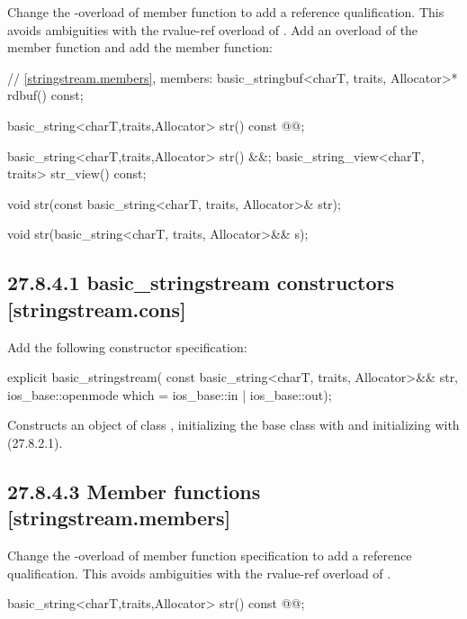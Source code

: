 \documentclass[ebook,11pt,article]{memoir}
\begin{document}
Change the -overload of  member function to add a reference qualification. This avoids ambiguities with the rvalue-ref overload of . Add an overload of the  member function and add the  member function:

\begin{codeblock}
    // \ref{stringstream.members}, members:
    basic_stringbuf<charT, traits, Allocator>* rdbuf() const;

    basic_string<charT,traits,Allocator> str() const @\ins{\&}@;
\end{codeblock}
\begin{addedblock}
\begin{codeblock}
    basic_string<charT,traits,Allocator> str() &&;
    basic_string_view<charT, traits> str_view() const;
\end{codeblock}
\end{addedblock}
\begin{codeblock}
    void str(const basic_string<charT, traits, Allocator>& str);
\end{codeblock}
\begin{addedblock}
\begin{codeblock}
    void str(basic_string<charT, traits, Allocator>&& s);
\end{codeblock}
\end{addedblock}

\subsection{27.8.4.1 basic\_stringstream constructors [stringstream.cons]}
Add the following constructor specification:
\begin{insrt}
\begin{itemdecl}
explicit basic_stringstream(
  const basic_string<charT, traits, Allocator>&& str,
  ios_base::openmode which = ios_base::in | ios_base::out);
\end{itemdecl}
\begin{itemdescr}
\pnum
\effects Constructs an object of class , initializing the base class with  and initializing  with  (27.8.2.1).
\end{itemdescr}
\end{insrt}

\subsection{27.8.4.3 Member functions [stringstream.members]}
Change the -overload of  member function specification to add a reference qualification. This avoids ambiguities with the rvalue-ref overload of .  
\begin{codeblock}
basic_string<charT,traits,Allocator> str() const @\ins{\&}@;
\end{codeblock}
\end{document}
